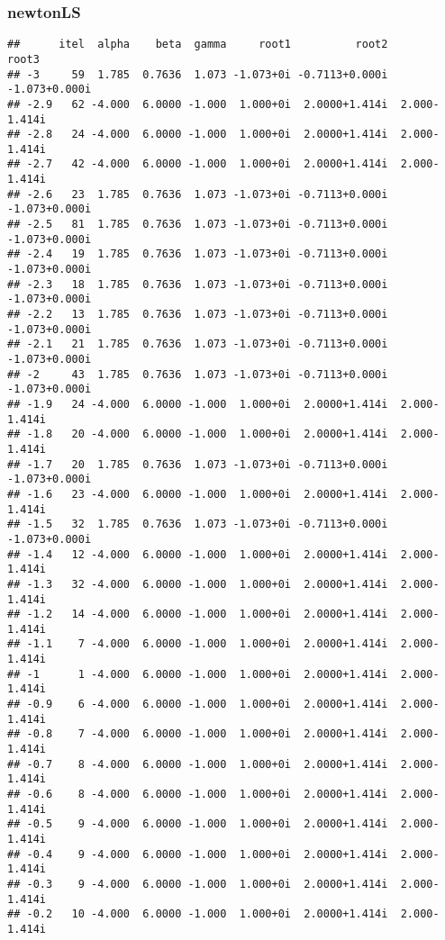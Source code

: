 \documentclass[
  12pt,
]{article}
\begin{document}
\normalsize

\subsubsection{newtonLS}\label{newtonls-3}

\footnotesize

\begin{verbatim}
##      itel  alpha    beta  gamma     root1          root2         root3
## -3     59  1.785  0.7636  1.073 -1.073+0i -0.7113+0.000i -1.073+0.000i
## -2.9   62 -4.000  6.0000 -1.000  1.000+0i  2.0000+1.414i  2.000-1.414i
## -2.8   24 -4.000  6.0000 -1.000  1.000+0i  2.0000+1.414i  2.000-1.414i
## -2.7   42 -4.000  6.0000 -1.000  1.000+0i  2.0000+1.414i  2.000-1.414i
## -2.6   23  1.785  0.7636  1.073 -1.073+0i -0.7113+0.000i -1.073+0.000i
## -2.5   81  1.785  0.7636  1.073 -1.073+0i -0.7113+0.000i -1.073+0.000i
## -2.4   19  1.785  0.7636  1.073 -1.073+0i -0.7113+0.000i -1.073+0.000i
## -2.3   18  1.785  0.7636  1.073 -1.073+0i -0.7113+0.000i -1.073+0.000i
## -2.2   13  1.785  0.7636  1.073 -1.073+0i -0.7113+0.000i -1.073+0.000i
## -2.1   21  1.785  0.7636  1.073 -1.073+0i -0.7113+0.000i -1.073+0.000i
## -2     43  1.785  0.7636  1.073 -1.073+0i -0.7113+0.000i -1.073+0.000i
## -1.9   24 -4.000  6.0000 -1.000  1.000+0i  2.0000+1.414i  2.000-1.414i
## -1.8   20 -4.000  6.0000 -1.000  1.000+0i  2.0000+1.414i  2.000-1.414i
## -1.7   20  1.785  0.7636  1.073 -1.073+0i -0.7113+0.000i -1.073+0.000i
## -1.6   23 -4.000  6.0000 -1.000  1.000+0i  2.0000+1.414i  2.000-1.414i
## -1.5   32  1.785  0.7636  1.073 -1.073+0i -0.7113+0.000i -1.073+0.000i
## -1.4   12 -4.000  6.0000 -1.000  1.000+0i  2.0000+1.414i  2.000-1.414i
## -1.3   32 -4.000  6.0000 -1.000  1.000+0i  2.0000+1.414i  2.000-1.414i
## -1.2   14 -4.000  6.0000 -1.000  1.000+0i  2.0000+1.414i  2.000-1.414i
## -1.1    7 -4.000  6.0000 -1.000  1.000+0i  2.0000+1.414i  2.000-1.414i
## -1      1 -4.000  6.0000 -1.000  1.000+0i  2.0000+1.414i  2.000-1.414i
## -0.9    6 -4.000  6.0000 -1.000  1.000+0i  2.0000+1.414i  2.000-1.414i
## -0.8    7 -4.000  6.0000 -1.000  1.000+0i  2.0000+1.414i  2.000-1.414i
## -0.7    8 -4.000  6.0000 -1.000  1.000+0i  2.0000+1.414i  2.000-1.414i
## -0.6    8 -4.000  6.0000 -1.000  1.000+0i  2.0000+1.414i  2.000-1.414i
## -0.5    9 -4.000  6.0000 -1.000  1.000+0i  2.0000+1.414i  2.000-1.414i
## -0.4    9 -4.000  6.0000 -1.000  1.000+0i  2.0000+1.414i  2.000-1.414i
## -0.3    9 -4.000  6.0000 -1.000  1.000+0i  2.0000+1.414i  2.000-1.414i
## -0.2   10 -4.000  6.0000 -1.000  1.000+0i  2.0000+1.414i  2.000-1.414i

\end{verbatim}
\end{document}
